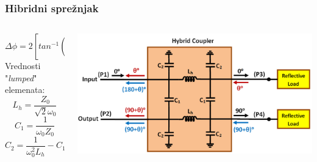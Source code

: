 \documentclass{beamer}
\begin{document}
\begin{frame}
\frametitle{Hibridni sprežnjak}
\begin{columns}
\begin{column}{0.5\textwidth}
   \begin{equation*}
    \Delta \phi = 2 [tan^{-1}(\dfrac{Z_{max}}{Z_0}) - tan^{-1}(\dfrac{Z_{min}}{Z_0}) ]
   \end{equation*}
   Vrednosti "\textit{lumped}" elemenata:
   \begin{equation*}
    L_h = \dfrac{Z_0}{\sqrt{2} \omega_0}
   \end{equation*}
   \begin{equation*}
    C_1 = \dfrac{1}{\omega_0 Z_0} 
   \end{equation*}
   \begin{equation*}
    C_2 = \dfrac{1}{\omega_0^2 L_h} - C_1
   \end{equation*}
\end{column}
\begin{column}{0.5\textwidth}  
    \begin{center}
     \includegraphics[width=\textwidth]{hybrid_coupler.png}
     \end{center}
\end{column}
\end{columns}
\end{frame}
\end{document}
